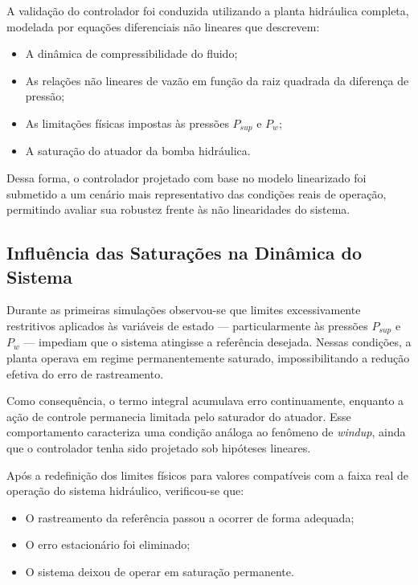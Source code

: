 A validação do controlador foi conduzida utilizando a planta hidráulica completa, modelada por equações diferenciais não lineares que descrevem:

\begin{itemize}
    \item A dinâmica de compressibilidade do fluido;
    \item As relações não lineares de vazão em função da raiz quadrada da diferença de pressão;
    \item As limitações físicas impostas às pressões $P_{sup}$ e $P_w$;
    \item A saturação do atuador da bomba hidráulica.
\end{itemize}

Dessa forma, o controlador projetado com base no modelo linearizado foi submetido a um cenário mais representativo das condições reais de operação, permitindo avaliar sua robustez frente às não linearidades do sistema.

\subsection{Influência das Saturações na Dinâmica do Sistema}

Durante as primeiras simulações observou-se que limites excessivamente restritivos aplicados às variáveis de estado — particularmente às pressões $P_{sup}$ e $P_w$ — impediam que o sistema atingisse a referência desejada. Nessas condições, a planta operava em regime permanentemente saturado, impossibilitando a redução efetiva do erro de rastreamento.

Como consequência, o termo integral acumulava erro continuamente, enquanto a ação de controle permanecia limitada pelo saturador do atuador. Esse comportamento caracteriza uma condição análoga ao fenômeno de \textit{windup}, ainda que o controlador tenha sido projetado sob hipóteses lineares.

Após a redefinição dos limites físicos para valores compatíveis com a faixa real de operação do sistema hidráulico, verificou-se que:

\begin{itemize}
    \item O rastreamento da referência passou a ocorrer de forma adequada;
    \item O erro estacionário foi eliminado;
    \item O sistema deixou de operar em saturação permanente.
\end{itemize}

